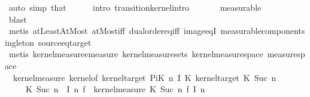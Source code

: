 \begin{isabellebody}
\ {\isacharparenleft}{\kern0pt}auto\ simp{\isacharcolon}{\kern0pt}\ that{\isacharparenright}{\kern0pt}\isanewline
\ \ \ \ \isamarkupfalse%
\ {\isacharparenleft}{\kern0pt}intro\ transition{\isacharunderscore}{\kern0pt}kernel{\isachardot}{\kern0pt}intro{\isacharparenright}{\kern0pt}\isanewline
\ \ \ \ \ \isamarkupfalse%
\ measurable\isanewline
\ \ \ \ \ \ \ \ \ \isamarkupfalse%
\ blast\isanewline
\ \ \ \ \ \ \ \isamarkupfalse%
\ {\isacharparenleft}{\kern0pt}metis\ atLeast{}AtMost\ atMost{\isacharunderscore}{\kern0pt}iff\ dual{\isacharunderscore}{\kern0pt}order{\isachardot}{\kern0pt}eq{\isacharunderscore}{\kern0pt}iff\ image{\isacharunderscore}{\kern0pt}eqI\ measurable{\isacharunderscore}{\kern0pt}component{\isacharunderscore}{\kern0pt}singleton\ source{\isacharunderscore}{\kern0pt}eq{\isacharunderscore}{\kern0pt}target{\isacharparenright}{\kern0pt}\isanewline
\ \ \ \ \isamarkupfalse%
\ {\isacharparenleft}{\kern0pt}metis\ kernel{\isacharunderscore}{\kern0pt}measure{\isacharunderscore}{\kern0pt}emeasure\ kernel{\isacharunderscore}{\kern0pt}measure{\isacharunderscore}{\kern0pt}sets\ kernel{\isacharunderscore}{\kern0pt}measure{\isacharunderscore}{\kern0pt}space\ measure{\isacharunderscore}{\kern0pt}space{\isacharparenright}{\kern0pt}\isanewline
\ \ \ \ \isamarkupfalse%
\isanewline
\ \ \isamarkupfalse%
\ {}{\isacharcolon}{\kern0pt}\ {\isachardoublequoteopen}kernel{\isacharunderscore}{\kern0pt}measure\ {\isacharparenleft}{\kern0pt}kernel{\isacharunderscore}{\kern0pt}of\ {\isacharparenleft}{\kern0pt}kernel{\isacharunderscore}{\kern0pt}target\ {\isacharparenleft}{\kern0pt}PiK\ n\ I\ K{\isacharparenright}{\kern0pt}{\isacharparenright}{\kern0pt}\ {\isacharparenleft}{\kern0pt}kernel{\isacharunderscore}{\kern0pt}target\ {\isacharparenleft}{\kern0pt}{\isacharquery}{\kern0pt}K\ {\isacharparenleft}{\kern0pt}Suc\ n{\isacharparenright}{\kern0pt}{\isacharparenright}{\kern0pt}{\isacharparenright}{\kern0pt}\isanewline
\ \ \ \ {\isacharparenleft}{\kern0pt}{\isasymlambda}{\isasymomega}{\isachardot}{\kern0pt}\ {\isacharquery}{\kern0pt}K\ {\isacharparenleft}{\kern0pt}Suc\ n{\isacharparenright}{\kern0pt}\ {\isacharparenleft}{\kern0pt}{\isasymomega}\ {\isacharparenleft}{\kern0pt}I\ n{\isacharparenright}{\kern0pt}{\isacharparenright}{\kern0pt}{\isacharparenright}{\kern0pt}{\isacharparenright}{\kern0pt}\ {\isasymomega}\isactrlsub f\ {\isacharequal}{\kern0pt}\ kernel{\isacharunderscore}{\kern0pt}measure\ {\isacharparenleft}{\kern0pt}{\isacharquery}{\kern0pt}K\ {\isacharparenleft}{\kern0pt}Suc\ n{\isacharparenright}{\kern0pt}{\isacharparenright}{\kern0pt}\ {\isacharparenleft}{\kern0pt}{\isasymomega}\isactrlsub f\ {\isacharparenleft}{\kern0pt}I\ n{\isacharparenright}{\kern0pt}{\isacharparenright}{\kern0pt}{\isachardoublequoteclose}\isanewline

\end{isabellebody}
